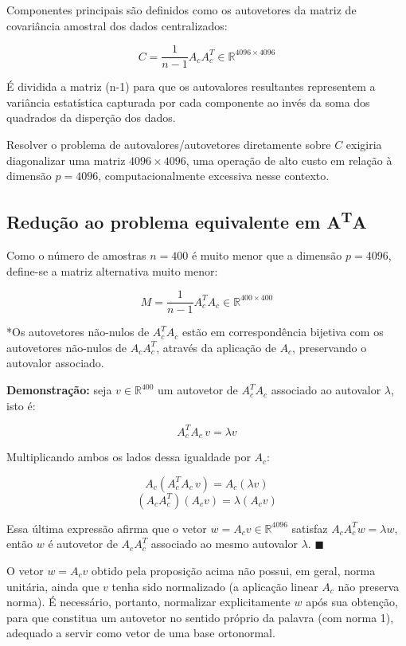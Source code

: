 \documentclass[12pt,a4paper]{article}
\begin{document}
Componentes principais são definidos como os autovetores da matriz de covariância
amostral dos dados centralizados:

$$C = \frac{1}{n-1} A_c A_c^T \in \mathbb{R}^{4096 \times 4096}$$

É dividida a matriz (n-1) para que os autovalores resultantes representem a variância estatística capturada por cada componente ao invés da soma dos quadrados da disperção dos dados.

Resolver o problema de autovalores/autovetores diretamente sobre $C$ exigiria
diagonalizar uma matriz $4096\times4096$, uma operação de alto custo em relação à dimensão $p=4096$, computacionalmente excessiva nesse
contexto.

\subsection{Redução ao problema equivalente em A\textsuperscript{T}A}

Como o número de amostras $n=400$ é muito menor que a dimensão $p=4096$, define-se a
matriz alternativa muito menor:

$$M = \frac{1}{n-1}A_c^TA_c \in \mathbb{R}^{400\times400}$$

*Os autovetores não-nulos de $A_c^TA_c$ estão em correspondência
bijetiva com os autovetores não-nulos de $A_cA_c^T$, através da aplicação de $A_c$,
preservando o autovalor associado.

\textbf{Demonstração:} seja $v \in \mathbb{R}^{400}$ um autovetor de $A_c^TA_c$ associado
ao autovalor $\lambda$, isto é:

$$A_c^TA_c\,v = \lambda v$$

Multiplicando ambos os lados dessa igualdade por $A_c$:

$$A_c\left(A_c^TA_c\,v\right) = A_c(\lambda v)$$
$$\left(A_cA_c^T\right)(A_cv) = \lambda(A_cv)$$

Essa última expressão afirma
que o vetor $w = A_cv \in \mathbb{R}^{4096}$ satisfaz $A_cA_c^T w = \lambda w$, então $w$ é autovetor de $A_cA_c^T$ associado ao mesmo autovalor $\lambda$.
$\blacksquare$

O vetor $w=A_cv$ obtido pela
proposição acima não possui, em geral, norma unitária, ainda que $v$ tenha sido
normalizado (a aplicação linear $A_c$ não preserva norma). É necessário, portanto,
normalizar explicitamente $w$ após sua obtenção, para que constitua um autovetor no
sentido próprio da palavra (com norma 1), adequado a servir como vetor de uma base
ortonormal.
\end{document}
